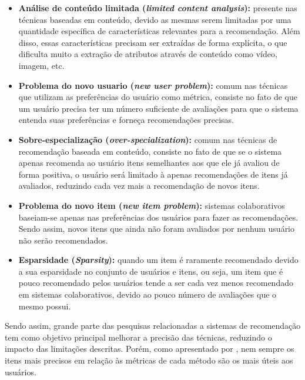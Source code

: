 \documentclass[12pt, openright, oneside, a4paper, brazil]{abntex2}
\begin{document}
\begin{itemize}

	\item \textbf{Análise de conteúdo limitada (\textit{limited content analysis}):} presente nas técnicas baseadas em conteúdo, devido as mesmas serem limitadas por uma quantidade específica de características relevantes para a recomendação. Além disso, essas características precisam ser extraídas de forma explícita, o que dificulta muito a extração de atributos através de conteúdo como vídeo, imagem, etc.

	\item \textbf{Problema do novo usuario (\textit{new user problem}):} comum nas técnicas que utilizam as preferências do usuário como métrica, consiste no fato de que um usuário precisa ter um número suficiente de avaliações para que o sistema entenda suas preferências e forneça recomendações precisas.

	\item \textbf{Sobre-especialização (\textit{over-specialization}):} comum nas técnicas de recomendação baseada em conteúdo, consiste no fato de que se o sistema apenas recomenda ao usuário itens semelhantes aos que ele já avaliou de forma positiva, o usuário será limitado à apenas recomendações de itens já avaliados, reduzindo cada vez mais a recomendação de novos itens.

	\item \textbf{Problema do novo item (\textit{new item problem}):} sistemas colaborativos baseiam-se apenas nas preferências dos usuários para fazer as recomendações. Sendo assim, novos itens que ainda não foram avaliados por nenhum usuário não serão recomendados.

	\item \textbf{Esparsidade (\textit{Sparsity}):} quando um item é raramente recomendado devido a sua esparsidade no conjunto de usuários e itens, ou seja, um item que é pouco recomendado pelos usuários tende a ser cada vez menos recomendado em sistemas colaborativos, devido ao pouco número de avaliações que o mesmo possui.

\end{itemize}

Sendo assim, grande parte das pesquisas relacionadas a sistemas de recomendação tem como objetivo principal melhorar a precisão das técnicas, reduzindo o impacto das limitações descritas. Porém, como apresentado por , nem sempre os itens mais precisos em relação às métricas de cada método são os mais úteis aos usuários.
\end{document}
